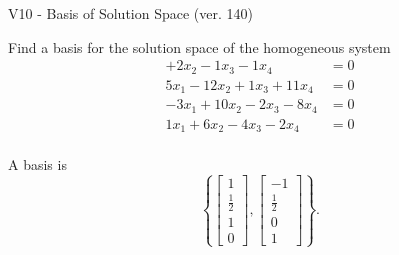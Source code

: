 \begin{exercise}
  \begin{exerciseTitle}V10 - Basis of Solution Space (ver. 140)\end{exerciseTitle}
  \begin{exerciseStatement}
    Find a basis for the solution space of the homogeneous system 
\begin{align*}
 + 2 x_ 2 -1 x_ 3 -1 x_ 4 &= 0  \\ 
  5 x_ 1 -12 x_ 2 + 1 x_ 3 + 11 x_ 4 &= 0  \\ 
  -3 x_ 1 + 10 x_ 2 -2 x_ 3 -8 x_ 4 &= 0  \\ 
  1 x_ 1 + 6 x_ 2 -4 x_ 3 -2 x_ 4 &= 0  \\ 
 \end{align*}


 
  \end{exerciseStatement}

  \begin{exerciseAnswer}
   A basis is   
\[\left\{\left[\begin{array}{c}
1 \\
\frac{1}{2} \\
1 \\
0
\end{array}\right] , \left[\begin{array}{c}
-1 \\
\frac{1}{2} \\
0 \\
1
\end{array}\right]\right\}.\]

  


  \end{exerciseAnswer}
\end{exercise}